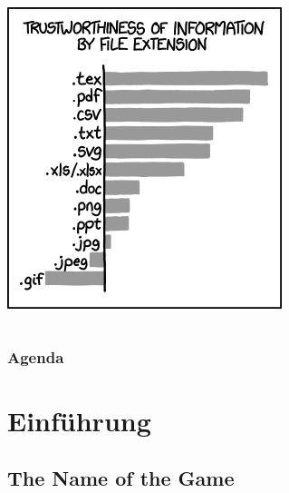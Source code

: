 \documentclass[t,ngerman]{beamer}
\begin{document}
\begin{frame}
\begin{columns}[T]
{\begin{column}{.45\textwidth}
{          \includegraphics[width=.9\textwidth]{xkcd-fileextensions}~
        }
      \end{column}
    } %
  \end{columns}
\end{frame}

\begin{frame}
  \frametitle{Agenda}
  \tableofcontents
\end{frame}

\section{Einf\"uhrung}

\subsection{The Name of the Game}
\end{document}
